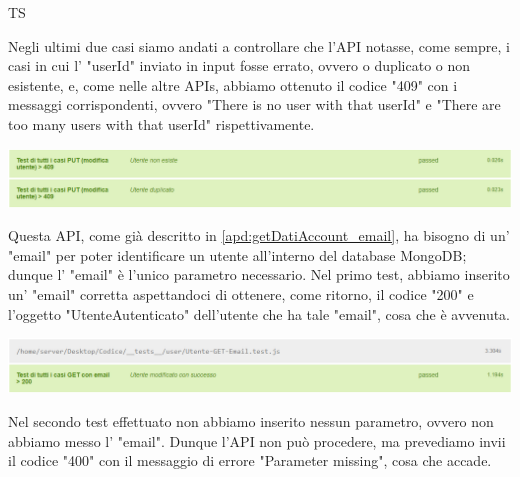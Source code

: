 \begin{listaPersonale}{TS}
\begin{center}
                \end{center}
                Negli ultimi due casi siamo andati a controllare che l'API notasse, come sempre, i casi in cui l' "userId" inviato in input fosse errato, ovvero o duplicato o non esistente, e, come nelle altre APIs, abbiamo ottenuto il codice "409" con i messaggi corrispondenti, ovvero "There is no user with that userId" e "There are too many users with that userId" rispettivamente.
                \begin{center}
                        \includegraphics[width=1\textwidth, height=0.08\textheight]{img/png/tests/UtentePut/409_userId_putUtente.png}
                \end{center}
                \newpage
                Questa API, come già descritto in \ref{apd:getDatiAccount_email}, ha bisogno di un' "email" per poter identificare un utente all'interno del database MongoDB; dunque l' "email" è l'unico parametro necessario. Nel primo test, abbiamo inserito un' "email" corretta aspettandoci di ottenere, come ritorno, il codice "200" e l'oggetto "UtenteAutenticato" dell'utente che ha tale "email", cosa che è avvenuta.
                \begin{center}
                        \includegraphics[width=1\textwidth, height=0.08\textheight]{img/png/tests/UtenteGet_email/200_getUtente_email.png}
                \end{center}
                Nel secondo test effettuato non abbiamo inserito nessun parametro, ovvero non abbiamo messo l' "email". Dunque l'API non può procedere, ma prevediamo invii il codice "400" con il messaggio di errore "Parameter missing", cosa che accade.

\end{listaPersonale}
